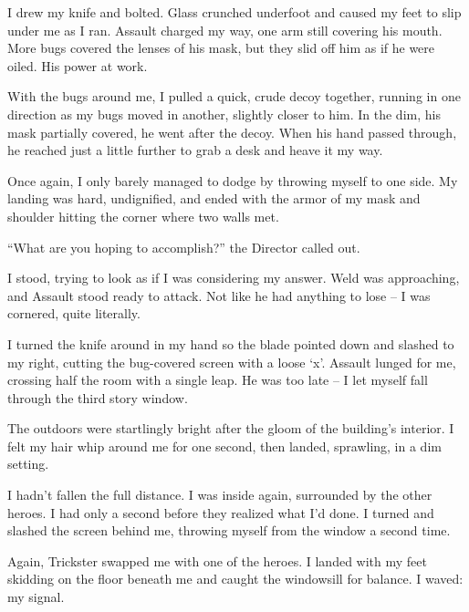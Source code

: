I drew my knife and bolted.  Glass crunched underfoot and caused my feet to slip under me as I ran.  Assault charged my way, one arm still covering his mouth.  More bugs covered the lenses of his mask, but they slid off him as if he were oiled.  His power at work.



With the bugs around me, I pulled a quick, crude decoy together, running in one direction as my bugs moved in another, slightly closer to him.  In the dim, his mask partially covered, he went after the decoy.  When his hand passed through, he reached just a little further to grab a desk and heave it my way.



Once again, I only barely managed to dodge by throwing myself to one side.  My landing was hard, undignified, and ended with the armor of my mask and shoulder hitting the corner where two walls met.



``What are you hoping to accomplish?'' the Director called out.



I stood, trying to look as if I was considering my answer.  Weld was approaching, and Assault stood ready to attack.  Not like he had anything to lose – I was cornered, quite literally.



I turned the knife around in my hand so the blade pointed down and slashed to my right, cutting the bug-covered screen with a loose `x'.  Assault lunged for me, crossing half the room with a single leap.  He was too late – I let myself fall through the third story window.



The outdoors were startlingly bright after the gloom of the building's interior.  I felt my hair whip around me for one second, then landed, sprawling, in a dim setting.



I hadn't fallen the full distance.  I was inside again, surrounded by the other heroes.  I had only a second before they realized what I'd done.  I turned and slashed the screen behind me, throwing myself from the window a second time.



Again, Trickster swapped me with one of the heroes.  I landed with my feet skidding on the floor beneath me and caught the windowsill for balance.  I waved: my signal.




